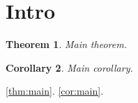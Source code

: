 \section{Intro}
\newtheorem{theorem}{Theorem}[section]
\newtheorem{cor}[theorem]{Corollary}
\begin{theorem}\label{thm:main}
Main theorem.
\end{theorem}
\begin{cor}\label{cor:main}
Main corollary.
\end{cor}
\autoref{thm:main}. \autoref{cor:main}.

